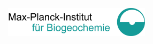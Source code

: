 \documentclass[portrait,final,a0paper,fontscale=0.345]{baposterSAB2018}
\begin{document}
\begin{poster}
{   \includegraphics[height=2em]{BGClogo}
  }
  \newcommand{\leftspan}{2}
  \newcommand{\leftcol}{0}


\end{poster}
\end{document}
